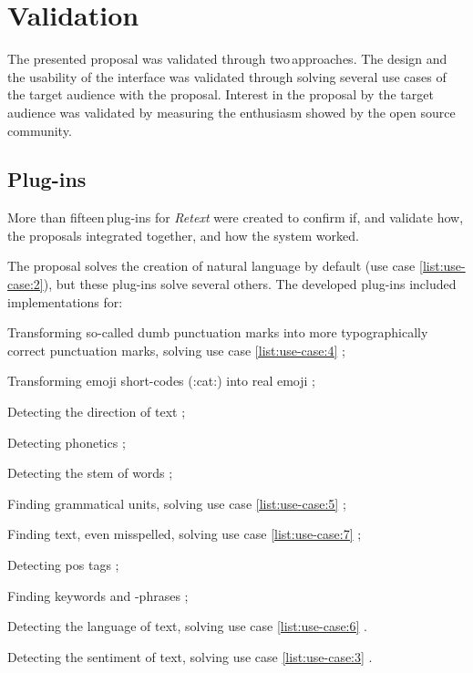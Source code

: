 \chapter{Validation}\label{validation}

The presented proposal was validated through two\,approaches.
The design and the usability of the interface was validated through
  solving several use cases of the target audience with the proposal.
Interest in the proposal by the target audience was validated by
  measuring the enthusiasm showed by the open source community.

\section{Plug-ins}\label{plugins}

More than fifteen\,plug-ins for \emph{Retext} were created to confirm if,
  and validate how, the proposals integrated together, and how the system
  worked.

The proposal solves the creation of natural language by default (use case
  \ref{list:use-case:2}), but these plug-ins solve several others.
The developed plug-ins included implementations for:

\begin{aenumerate}
\item Transforming so-called dumb punctuation marks into more
  typographically correct punctuation marks, solving use case
  \ref{list:use-case:4} \autocite*{wooorm/retext-smartypants-source-code};
\item Transforming emoji short-codes (:cat:) into real emoji
  \autocite*{wooorm/retext-emoji-source-code};
\item Detecting the direction of text
  \autocite*{wooorm/retext-directionality-source-code};
\item Detecting phonetics
  \autocite*{wooorm/retext-double-metaphone-source-code};
\item Detecting the stem of words
  \autocite*{wooorm/retext-porter-stemmer-source-code};
\item Finding grammatical units, solving use case
  \ref{list:use-case:5}  \autocite*{wooorm/retext-visit-source-code};
\item Finding text, even misspelled, solving use case
  \ref{list:use-case:7} \autocite*{wooorm/retext-search-source-code};
\item Detecting \gls{pos} tags \autocite*{wooorm/retext-pos-source-code};
\item Finding keywords and -phrases
  \autocite*{wooorm/retext-keywords-source-code};
\item Detecting the language of text, solving use case \ref{list:use-case:6}
  \autocite*{wooorm/retext-language-source-code}.
\item Detecting the sentiment of text, solving use case \ref{list:use-case:3}
  \autocite*{wooorm/retext-sentiment-source-code}.
\end{aenumerate}

